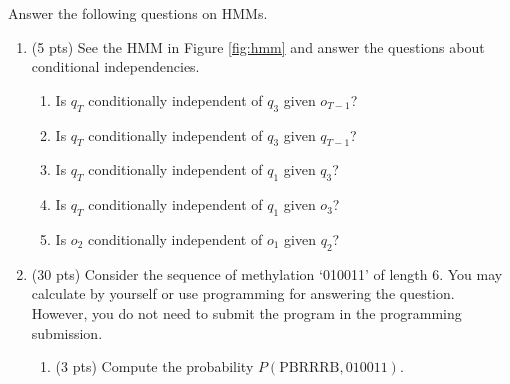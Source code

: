 \documentclass[11pt]{article}
\begin{document}
\begin{enumerate}
Answer the following questions on HMMs.

\begin{enumerate}
\item (5 pts) See the HMM in Figure \ref{fig:hmm} and answer the questions about conditional independencies.
\begin{enumerate}
\item Is $q_T$ conditionally independent of $q_3$ given $o_{T-1}$?
\newline
\begin{tcolorbox}[fit,height=1cm, width=10cm, blank, borderline={1pt}{-2pt},nobeforeafter]

\end{tcolorbox}
\item Is $q_T$ conditionally independent of $q_3$ given $q_{T-1}$?
\newline
\begin{tcolorbox}[fit,height=1cm, width=10cm, blank, borderline={1pt}{-2pt},nobeforeafter]

\end{tcolorbox}
\item Is $q_T$ conditionally independent of $q_1$ given $q_{3}$?
\newline
\begin{tcolorbox}[fit,height=1cm, width=10cm, blank, borderline={1pt}{-2pt},nobeforeafter]

\end{tcolorbox}
\item Is $q_T$ conditionally independent of $q_1$ given $o_{3}$?
\newline
\begin{tcolorbox}[fit,height=1cm, width=10cm, blank, borderline={1pt}{-2pt},nobeforeafter]

\end{tcolorbox}
\item Is $o_2$ conditionally independent of $o_1$ given $q_{2}$?
\newline
\begin{tcolorbox}[fit,height=1cm, width=10cm, blank, borderline={1pt}{-2pt},nobeforeafter]

\end{tcolorbox}
\end{enumerate}

\item (30 pts) Consider the sequence of methylation `010011' of length 6. You may calculate by yourself or use programming for answering the question. However, you do not need to submit the program in the programming submission. 
\begin{enumerate}
\item (3 pts) Compute the probability $P(\text{PBRRRB},010011)$.
\newline
\begin{tcolorbox}[fit,height=5cm, width=15cm, blank, borderline={1pt}{-2pt},nobeforeafter]


\end{tcolorbox}
\end{enumerate}
\end{enumerate}
\end{enumerate}
\end{document}
